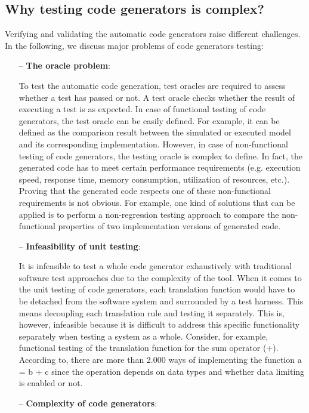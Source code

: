\subsection{Why testing code generators is complex?}
\label{sec:Why testing code generators is complex?}
Verifying and validating the automatic code generators raise different challenges.
In the following, we discuss major problems of code generators testing:
\begin{itemize}
	\item[--] \textbf{The oracle problem}: 
	
	To test the automatic code generation, test oracles are required to assess whether a test has passed or not. A test
	oracle checks whether the result of executing a test is as expected.
	In case of functional testing of code generators, the test oracle can be easily defined. For example, it can be defined as the comparison result between the simulated or executed model and its corresponding implementation. 
	However, in case of non-functional testing of code generators, the testing oracle is complex to define. In fact, the generated code has to meet certain performance requirements (e.g. execution speed, response time, memory consumption, utilization of resources, etc.). Proving that the generated code respects one of these non-functional requirements is not obvious. For example, one kind of solutions that can be applied is to perform a non-regression testing approach to compare the non-functional properties of two implementation versions of generated code.
	
	\item[--] \textbf{Infeasibility of unit testing}:
	 
	It is infeasible to test a whole code generator exhaustively with traditional software test approaches due to the complexity of the tool. When it comes to the unit testing of code generators, each translation function would have to be detached from the software system and surrounded by a test harness. This means decoupling each translation rule and testing it separately. This is, however, infeasible because it is difficult to address this specific functionality separately when testing a system as a whole. 
	Consider, for example, functional testing of the translation function for the sum operator (+). According to\cite{burnard2004verifying}, there are more than 2.000 ways of implementing the function a = b + c since the operation depends on data types and whether data limiting is enabled or not.
		
	\item[--] \textbf{Complexity of code generators}: 
	

\end{itemize}
